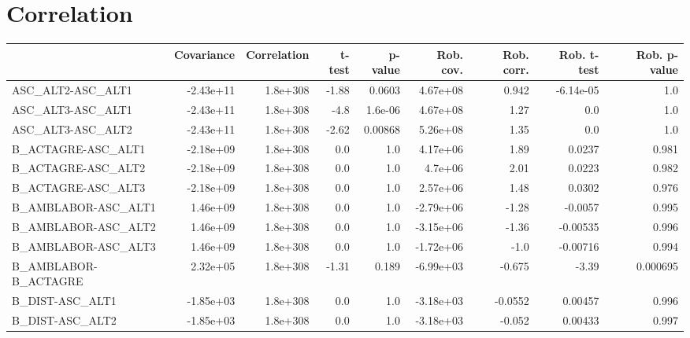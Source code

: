 \section{Correlation}
\begin{tabular}{lrrrrrrrr}
\toprule
{} &  Covariance &  Correlation &  t-test &  p-value &  Rob. cov. &  Rob. corr. &  Rob. t-test &  Rob. p-value \\
\midrule
ASC\_ALT2-ASC\_ALT1                 &   -2.43e+11 &     1.8e+308 &   -1.88 &   0.0603 &   4.67e+08 &       0.942 &    -6.14e-05 &           1.0 \\
ASC\_ALT3-ASC\_ALT1                 &   -2.43e+11 &     1.8e+308 &    -4.8 &  1.6e-06 &   4.67e+08 &        1.27 &          0.0 &           1.0 \\
ASC\_ALT3-ASC\_ALT2                 &   -2.43e+11 &     1.8e+308 &   -2.62 &  0.00868 &   5.26e+08 &        1.35 &          0.0 &           1.0 \\
B\_ACTAGRE-ASC\_ALT1                &   -2.18e+09 &     1.8e+308 &     0.0 &      1.0 &   4.17e+06 &        1.89 &       0.0237 &         0.981 \\
B\_ACTAGRE-ASC\_ALT2                &   -2.18e+09 &     1.8e+308 &     0.0 &      1.0 &    4.7e+06 &        2.01 &       0.0223 &         0.982 \\
B\_ACTAGRE-ASC\_ALT3                &   -2.18e+09 &     1.8e+308 &     0.0 &      1.0 &   2.57e+06 &        1.48 &       0.0302 &         0.976 \\
B\_AMBLABOR-ASC\_ALT1               &    1.46e+09 &     1.8e+308 &     0.0 &      1.0 &  -2.79e+06 &       -1.28 &      -0.0057 &         0.995 \\
B\_AMBLABOR-ASC\_ALT2               &    1.46e+09 &     1.8e+308 &     0.0 &      1.0 &  -3.15e+06 &       -1.36 &     -0.00535 &         0.996 \\
B\_AMBLABOR-ASC\_ALT3               &    1.46e+09 &     1.8e+308 &     0.0 &      1.0 &  -1.72e+06 &        -1.0 &     -0.00716 &         0.994 \\
B\_AMBLABOR-B\_ACTAGRE              &    2.32e+05 &     1.8e+308 &   -1.31 &    0.189 &  -6.99e+03 &      -0.675 &        -3.39 &      0.000695 \\
B\_DIST-ASC\_ALT1                   &   -1.85e+03 &     1.8e+308 &     0.0 &      1.0 &  -3.18e+03 &     -0.0552 &      0.00457 &         0.996 \\
B\_DIST-ASC\_ALT2                   &   -1.85e+03 &     1.8e+308 &     0.0 &      1.0 &  -3.18e+03 &      -0.052 &      0.00433 &         0.997 \\

\end{tabular}
